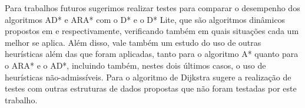 Para trabalhos futuros sugerimos realizar testes para comparar o desempenho dos algoritmos AD* e ARA* com o D* e o D* Lite, que são algoritmos dinâmicos propostos em  e  respectivamente, verificando também em quais situações cada um melhor se aplica. Além disso, vale também um estudo do uso de outras heurísticas além das que foram aplicadas, tanto para o algoritmo A* quanto para o ARA* e o AD*, incluindo também, nestes dois últimos casos, o uso de heurísticas não-admissíveis. Para o algoritmo de Dijkstra sugere a realização de testes com outras estruturas de dados propostas que não foram testadas por este trabalho.